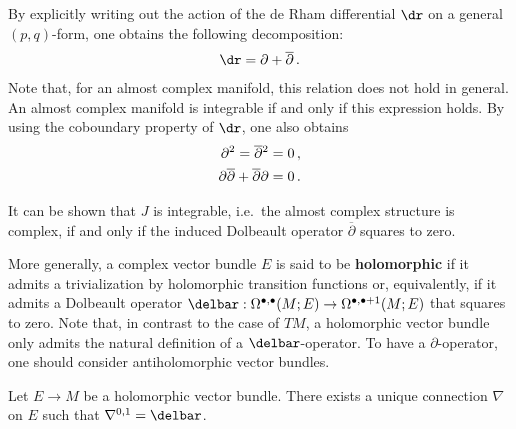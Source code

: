     \begin{property}
        By explicitly writing out the action of the de Rham differential $\dr$ on a general $(p,q)$-form, one obtains the following decomposition:
        \begin{gather}
            \dr=\partial+\overline{\partial}\,.
        \end{gather}
        Note that, for an almost complex manifold, this relation does not hold in general. An almost complex manifold is integrable if and only if this expression holds. By using the coboundary property of $\dr$, one also obtains
        \begin{gather}
            \begin{aligned}
                \partial^2 = \overline{\partial}\vphantom{\partial}^2 &= 0\,,\\
                \partial\overline{\partial} + \overline{\partial}\partial &= 0\,.
            \end{aligned}
        \end{gather}
    \end{property}
    \begin{remark}[Integrability]
        It can be shown that $J$ is integrable, i.e.~the almost complex structure is complex, if and only if the induced Dolbeault operator $\overline{\partial}$ squares to zero.

        More generally, a complex vector bundle $E$ is said to be \textbf{holomorphic} if it admits a trivialization by holomorphic transition functions or, equivalently, if it admits a Dolbeault operator $\delbar:\Omega^{\bullet,\bullet}(M;E)\rightarrow\Omega^{\bullet,\bullet+1}(M;E)$ that squares to zero. Note that, in contrast to the case of $TM$, a holomorphic vector bundle only admits the natural definition of a $\delbar$-operator. To have a $\partial$-operator, one should consider antiholomorphic vector bundles.
    \end{remark}

    \begin{theorem}\label{complex:koszul_malgrange}
        Let $E\rightarrow M$ be a holomorphic vector bundle. There exists a unique connection $\nabla$ on $E$ such that $\nabla^{0,1}=\delbar$.
    \end{theorem}

